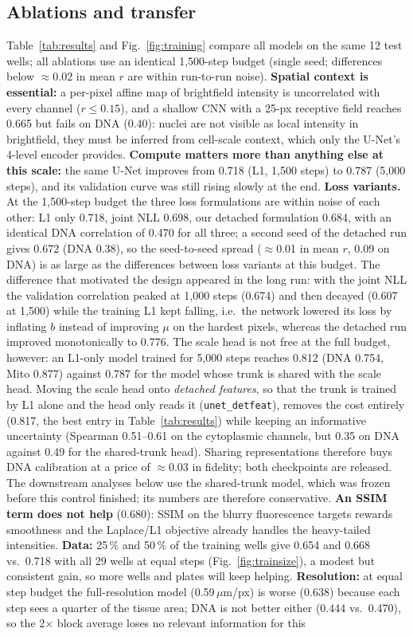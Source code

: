 \documentclass[11pt,a4paper]{article}
\begin{document}
\subsection{Ablations and transfer}
Table~\ref{tab:results} and Fig.~\ref{fig:training} compare all models on the same 12 test wells; all ablations use an identical 1,500-step budget (single seed; differences below $\approx$0.02 in mean $r$ are within run-to-run noise). \textbf{Spatial context is essential:} a per-pixel affine map of brightfield intensity is uncorrelated with every channel ($r \le 0.15$), and a shallow CNN with a 25-px receptive field reaches 0.665 but fails on DNA (0.40): nuclei are not visible as local intensity in brightfield, they must be inferred from cell-scale context, which only the U-Net's 4-level encoder provides. \textbf{Compute matters more than anything else at this scale:} the same U-Net improves from 0.718 (L1, 1,500 steps) to 0.787 (5,000 steps), and its validation curve was still rising slowly at the end. \textbf{Loss variants.} At the 1,500-step budget the three loss formulations are within noise of each other: L1 only 0.718, joint NLL 0.698, our detached formulation 0.684, with an identical DNA correlation of 0.470 for all three; a second seed of the detached run gives 0.672 (DNA 0.38), so the seed-to-seed spread ($\approx$0.01 in mean $r$, 0.09 on DNA) is as large as the differences between loss variants at this budget. The difference that motivated the design appeared in the long run: with the joint NLL the validation correlation peaked at 1,000 steps (0.674) and then decayed (0.607 at 1,500) while the training L1 kept falling, i.e.\ the network lowered its loss by inflating $b$ instead of improving $\mu$ on the hardest pixels, whereas the detached run improved monotonically to 0.776. The scale head is not free at the full budget, however: an L1-only model trained for 5,000 steps reaches 0.812 (DNA 0.754, Mito 0.877) against 0.787 for the model whose trunk is shared with the scale head. Moving the scale head onto \emph{detached features}, so that the trunk is trained by L1 alone and the head only reads it (\texttt{unet\_detfeat}), removes the cost entirely (0.817, the best entry in Table~\ref{tab:results}) while keeping an informative uncertainty (Spearman 0.51--0.61 on the cytoplasmic channels, but 0.35 on DNA against 0.49 for the shared-trunk head). Sharing representations therefore buys DNA calibration at a price of $\approx$0.03 in fidelity; both checkpoints are released. The downstream analyses below use the shared-trunk model, which was frozen before this control finished; its numbers are therefore conservative. \textbf{An SSIM term does not help} (0.680): SSIM on the blurry fluorescence targets rewards smoothness and the Laplace/L1 objective already handles the heavy-tailed intensities. \textbf{Data:} 25\,\% and 50\,\% of the training wells give 0.654 and 0.668 vs.\ 0.718 with all 29 wells at equal steps (Fig.~\ref{fig:trainsize}), a modest but consistent gain, so more wells and plates will keep helping. \textbf{Resolution:} at equal step budget the full-resolution model (0.59\,$\mu$m/px) is worse (0.638) because each step sees a quarter of the tissue area; DNA is not better either (0.444 vs.\ 0.470), so the 2$\times$ block average loses no relevant information for this 
\end{document}
